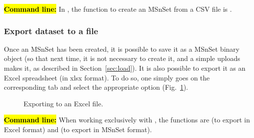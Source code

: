 \documentclass[12pt]{article}
\begin{document}
{\hl{\bf Command line:} In , the function to create an MSnSet 
from a CSV file is .



\subsubsection{Export dataset to a file}
Once an MSnSet has been created, it is possible to save it as a MSnSet binary 
object (so that next time, it is not necessary to create it, and a simple 
uploads makes it, as described in Section~\ref{sec:load}). It is also possible 
to export it as an Excel spreadsheet (in xlsx format). To do so, one simply 
goes on the corresponding tab and select the appropriate option 
(Fig.~\ref{fig:export}).


\begin {figure}
\centering
{}
\caption{Exporting to an Excel file.}\label{fig:export}
\end {figure}




\hl{\bf Command line:} When working exclusively with , the 
functions are  (to export in Excel format) 
and  (to export in MSnSet format).


}
\end{document}
